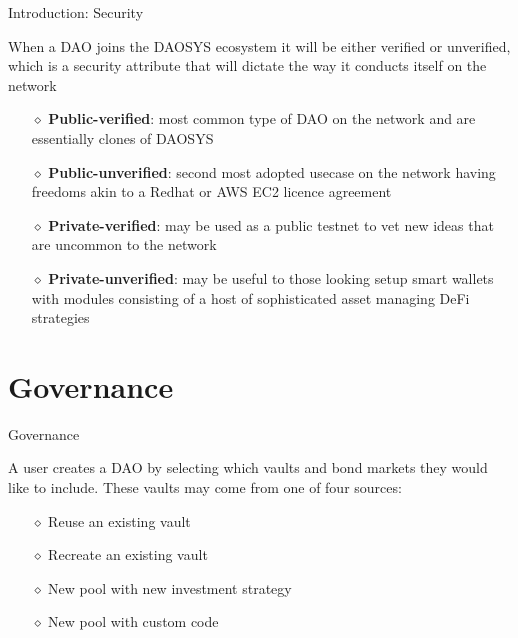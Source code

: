 \documentclass[10pt,xcolor=svgnames]{beamer} %
\begin{document}
\begin{frame}{Introduction: Security}

When a DAO joins the DAOSYS ecosystem it will be either verified or unverified, which is a security attribute that will dictate the way it conducts itself on the network

\begin{itemize}
  \item[$\diamond$] \textbf{Public-verified}: most common type of DAO on the network and are essentially clones of DAOSYS
  \item[$\diamond$] \textbf{Public-unverified}: second most adopted usecase on the network having freedoms akin to a Redhat or AWS EC2 licence agreement
  \item[$\diamond$] \textbf{Private-verified}: may be used as a public testnet to vet new ideas that are uncommon to the network
  \item[$\diamond$] \textbf{Private-unverified}: may be useful to those looking setup smart wallets with modules consisting of a host of sophisticated asset managing DeFi strategies
\end{itemize} 
\end{frame}

\section{Governance}


\begin{frame}{Governance} 

A user creates a DAO by selecting which vaults and bond markets they would like to include. These vaults may come from one of four sources:

\begin{itemize}
  \item[$\diamond$] Reuse an existing vault
  \item[$\diamond$] Recreate an existing vault
  \item[$\diamond$] New pool with new investment strategy
  \item[$\diamond$] New pool with custom code
\end{itemize} 

\end{frame}
\end{document}
